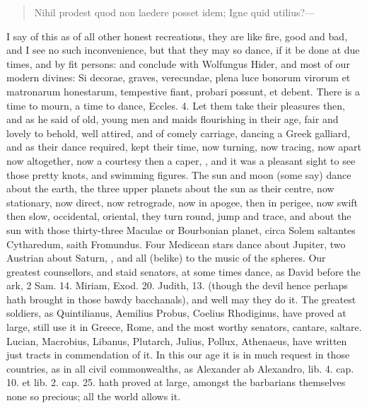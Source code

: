 \begin{latin}
\begin{verse}
Nihil prodest quod non laedere posset idem;
Igne quid utilius?---
\end{verse}
\end{latin}

I say of this as of all other honest recreations, they are like fire,
good and bad, and I see no such inconvenience, but that they may so
dance, if it be done at due times, and by fit persons: and conclude
with Wolfungus Hider, and most of our modern divines: Si decorae,
graves, verecundae, plena luce bonorum virorum et matronarum
honestarum, tempestive fiant, probari possunt, et debent. There is a
time to mourn, a time to dance, Eccles.  4. Let them take their
pleasures then, and as  he said of old, young men and maids
flourishing in their age, fair and lovely to behold, well attired, and
of comely carriage, dancing a Greek galliard, and as their dance
required, kept their time, now turning, now tracing, now apart now
altogether, now a courtesy then a caper, \etc{}, and it was a pleasant
sight to see those pretty knots, and swimming figures. The sun and moon
(some say) dance about the earth, the three upper planets about the sun
as their centre, now stationary, now direct, now retrograde, now in
apogee, then in perigee, now swift then slow, occidental, oriental,
they turn round, jump and trace, \Venus{} and \Mercury{} about the sun with those
thirty-three Maculae or Bourbonian planet, circa Solem saltantes
Cytharedum, saith Fromundus. Four Medicean stars dance about Jupiter,
two Austrian about Saturn, \etc{}, and all (belike) to the music of the
spheres. Our greatest counsellors, and staid senators, at some times
dance, as David before the ark, 2 Sam.  14. Miriam, Exod.  20.
Judith,  13. (though the devil hence perhaps hath brought in those
bawdy bacchanals), and well may they do it. The greatest soldiers, as
 Quintilianus, Aemilius Probus, Coelius Rhodiginus,
have proved at large, still use it in Greece, Rome, and the most worthy
senators, cantare, saltare. Lucian, Macrobius, Libanus, Plutarch,
Julius, Pollux, Athenaeus, have written just tracts in commendation of
it. In this our age it is in much request in those countries, as in all
civil commonwealths, as Alexander ab Alexandro, lib. 4. cap. 10. et
lib. 2. cap. 25. hath proved at large, amongst the barbarians
themselves none so precious; all the world allows it.

